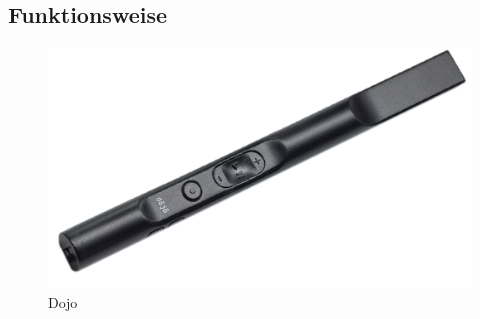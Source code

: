 \subsection{Funktionsweise} \label{sec:funktionsweise}

\begin{figure}[H]
	\begin{center}
		\includegraphics[width=140mm]{data/Dojo.png}
		\caption[Dojo]{Dojo} %
		\label{fig:Dojo}
	\end{center}
\end{figure}